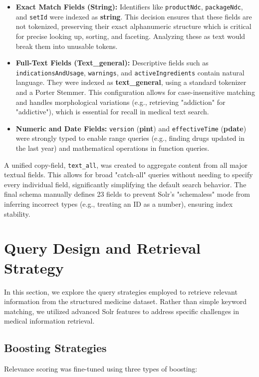 \begin{itemize}
    \item \textbf{Exact Match Fields (String):} Identifiers like \texttt{productNdc}, \texttt{packageNdc}, and \texttt{setId} were indexed as \textbf{string}. This decision ensures that these fields are not tokenized, preserving their exact alphanumeric structure which is critical for precise looking up, sorting, and faceting. Analyzing these as text would break them into unusable tokens.
    \item \textbf{Full-Text Fields (Text\_general):} Descriptive fields such as \texttt{indicationsAndUsage}, \texttt{warnings}, and \texttt{activeIngredients} contain natural language. They were indexed as \textbf{text\_general}, using a standard tokenizer and a Porter Stemmer. This configuration allows for case-insensitive matching and handles morphological variations (e.g., retrieving "addiction" for "addictive"), which is essential for recall in medical text search.
    \item \textbf{Numeric and Date Fields:} \texttt{version} (\textbf{pint}) and \texttt{effectiveTime} (\textbf{pdate}) were strongly typed to enable range queries (e.g., finding drugs updated in the last year) and mathematical operations in function queries.
\end{itemize}

A unified copy-field, \texttt{text\_all}, was created to aggregate content from all major textual fields. This allows for broad "catch-all" queries without needing to specify every individual field, significantly simplifying the default search behavior. The final schema manually defines 23 fields to prevent Solr's "schemaless" mode from inferring incorrect types (e.g., treating an ID as a number), ensuring index stability.


\section{Query Design and Retrieval Strategy}

In this section, we explore the query strategies employed to retrieve relevant information from the structured medicine dataset. Rather than simple keyword matching, we utilized advanced Solr features to address specific challenges in medical information retrieval.

\subsection{Boosting Strategies}
Relevance scoring was fine-tuned using three types of boosting:

